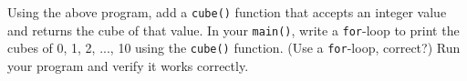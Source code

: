Using the above program, add a \texttt{cube()} function that accepts an integer value and returns the cube of that value. In your \texttt{main()}, write a \texttt{for}-loop to print the cubes of 0, 1, 2, ..., 10 using the \texttt{cube()} function. (Use a \texttt{for}-loop, correct?) Run your program and verify it works correctly.

